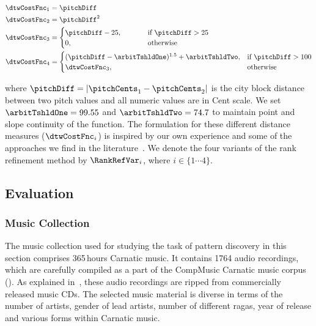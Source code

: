 \begin{equation}
\begin{aligned}
\dtwCostFnc_1& = \pitchDiff \hspace{.5em}\\
\dtwCostFnc_2& = \pitchDiff^2 \hspace{.5em}\\
\dtwCostFnc_3& = 
\begin{cases}
\pitchDiff-25, & \hspace{1cm} \text{if } \pitchDiff >25\\
0, & \hspace{1cm}\text{otherwise } 
\end{cases}\\
\dtwCostFnc_4 &= 
\begin{cases}
(\pitchDiff-\arbitTshldOne)^{1.5} + \arbitTshldTwo, & \text{if } \pitchDiff >100\\
\dtwCostFnc_3, & \text{otherwise}
\end{cases}
\end{aligned}
\label{eq:distance_measures_discovery}
\end{equation}

\noindent where $\pitchDiff = |\pitchCents_1-\pitchCents_2|$ is the city block distance between two pitch values and all numeric values are in Cent scale. We set $\arbitTshldOne =99.55$ and $\arbitTshldTwo = 74.7$ to maintain point and slope continuity of the function. The formulation for these different distance measures ($\dtwCostFnc_i$) is inspired by our own experience and some of the approaches we find in the literature~\citep{Ishwar2013,Rao2014}. We denote the four variants of the rank refinement method by $\RankRefVar_i$, where $i \in \lbrace 1\cdots4 \rbrace$.


\subsection{Evaluation}

\subsubsection{Music Collection}
\label{sec:pattern_discovery_musiccollection}

The music collection used for studying the task of pattern discovery in this section comprises 365\,hours Carnatic music. It contains 1764 audio recordings, which are carefully compiled as a part of the CompMusic Carnatic music corpus (). As explained in~, these audio recordings are ripped from commercially released music CDs. The selected music material is diverse in terms of the number of artists, gender of lead artists, number of different \glspl{raga}, year of release and various forms within Carnatic music.

